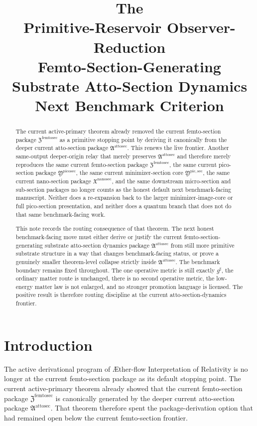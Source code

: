 \documentclass[11pt]{article}
\title{\textbf{The \TheoryName{}}\\[0.4em]
\large Primitive-Reservoir Observer-Reduction\\
\large Femto-Section-Generating Substrate Atto-Section Dynamics\\
\large Next Benchmark Criterion}
\author{}
\date{}
\newcommand{\Aflow}{\AE{}ther-flow}
\newcommand{\TheoryName}{\Aflow{} Interpretation of Relativity}
\newcommand{\CompletedMetric}{g^{\sharp}}
\newcommand{\NanoSectionPackage}{\mathfrak X^{\mathrm{nanosec}}}
\newcommand{\PicoSectionPackage}{\mathfrak Y^{\mathrm{picosec}}}
\newcommand{\PicoMinSectionCore}{\mathfrak Y^{\mathrm{pic,sec}}}
\newcommand{\FemtoSectionPackage}{\mathfrak Z^{\mathrm{femtosec}}}
\newcommand{\AttoSectionPackage}{\mathfrak A^{\mathrm{attosec}}}
\begin{document}
\maketitle

\begin{abstract}
The current active-primary theorem already removed the current femto-section package \(\FemtoSectionPackage\) as a primitive stopping point by deriving it canonically from the deeper current atto-section package \(\AttoSectionPackage\). This renews the live frontier. Another same-output deeper-origin relay that merely preserves \(\AttoSectionPackage\) and therefore merely reproduces the same current femto-section package \(\FemtoSectionPackage\), the same current pico-section package \(\PicoSectionPackage\), the same current minimizer-section core \(\PicoMinSectionCore\), the same current nano-section package \(\NanoSectionPackage\), and the same downstream micro-section and sub-section packages no longer counts as the honest default next benchmark-facing manuscript. Neither does a re-expansion back to the larger minimizer-image-core or full pico-section presentation, and neither does a quantum branch that does not do that same benchmark-facing work.

This note records the routing consequence of that theorem. The next honest benchmark-facing move must either derive or justify the current femto-section-generating substrate atto-section dynamics package \(\AttoSectionPackage\) from still more primitive substrate structure in a way that changes benchmark-facing status, or prove a genuinely smaller theorem-level collapse strictly inside \(\AttoSectionPackage\). The benchmark boundary remains fixed throughout. The one operative metric is still exactly \(\CompletedMetric\), the ordinary matter route is unchanged, there is no second operative metric, the low-energy matter law is not enlarged, and no stronger promotion language is licensed. The positive result is therefore routing discipline at the current atto-section-dynamics frontier.
\end{abstract}

\section{Introduction}

The active derivational program of \TheoryName{} is no longer at the current femto-section package as its default stopping point. The current active-primary theorem already showed that the current femto-section package \(\FemtoSectionPackage\) is canonically generated by the deeper current atto-section package \(\AttoSectionPackage\). That theorem therefore spent the package-derivation option that had remained open below the current femto-section frontier.
\end{document}
